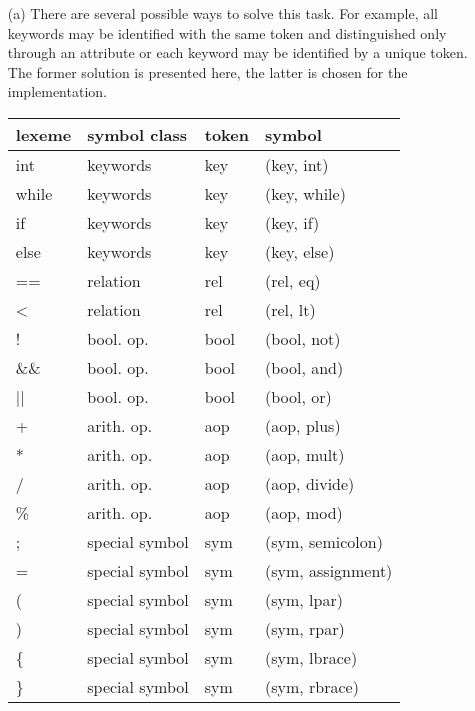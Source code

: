 \begin{solution}

\begin{enumerate}
  \item[(a)] There are several possible ways to solve this task. For example, all keywords may be identified with the same token and distinguished only through an attribute or each keyword may be identified by a unique token. The former solution is presented here, the latter is chosen for the implementation.
\begin{longtable}{Llll}
      \hline
      lexeme              & symbol class & token & symbol \\
      \hline
      int        & keywords  & key & (key, int) \\
      while      & keywords  & key & (key, while) \\
      if         & keywords  & key & (key, if) \\
      else       & keywords  & key & (key, else) \\

      ==         & relation  & rel & (rel, eq) \\
      <          & relation  & rel & (rel, lt) \\

      !          & bool. op. & bool & (bool, not) \\
      \&\&       & bool. op. & bool & (bool, and) \\
      ||         & bool. op. & bool & (bool, or) \\

      +          & arith. op. & aop & (aop, plus) \\
      *          & arith. op. & aop & (aop, mult) \\
      /          & arith. op. & aop & (aop, divide) \\
      \%          & arith. op. & aop & (aop, mod) \\

      ;          & special symbol & sym & (sym, semicolon) \\
      =          & special symbol & sym & (sym, assignment) \\
      (          & special symbol & sym & (sym, lpar) \\
      )          & special symbol & sym & (sym, rpar) \\
      \{         & special symbol & sym & (sym, lbrace) \\
      \}         & special symbol & sym & (sym, rbrace) \\


\end{longtable}
\end{enumerate}
\end{solution}
